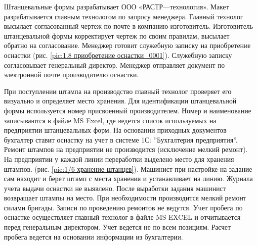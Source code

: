 Штанцевальные формы разрабатывает ООО «РАСТР—технология».
Макет разрабатывается главным технологом по запросу менеджера. 
Главный технолог высылает согласованный чертеж по почте в компанию-изготовитель.
Изготовитель штанцевальной формы корректирует чертеж по своим правилам, высылает обратно на согласование. Менеджер готовит служебную записку на приобретение оснастки (рис. \ref{pic:1.8 приобретение оснастки_0001}). Служебную записку согласовывает генеральный директор. Менеджер отправляет документ по электронной почте производителю оснастки.%

При поступлении штампа на производство главный технолог  проверяет его визуально и определяет место хранения. Для идентификации штанцевальной формы используется номер присвоенный производителем. Номер и наименование записываются в файле  MS Excel, где ведется список используемых на предприятии штанцевальных форм. На основании приходных документов бухгалтер ставит оснастку на учет в системе 1С: ''Бухгалтерия предприятия''. Ремонт штампов на предприятии не производится (исключение мелкий ремонт). 
На предприятии у каждой линии переработки выделено место для хранения штампов.  (рис. \ref{pic:1/6 хранение штанцев}).
Машинист при настройке на задание сам находит и берет штамп с места хранения и устанавливает на линию. Журнала учета выдачи оснастки не выявлено. После выработки задания машинист  возвращает штампы на место. При необходимости производится мелкий ремонт силами бригады. Записи по проведению ремонтов не ведутся. 
Учет пробега по оснастке осуществляет главный технолог в файле MS EXCEL и отчитывается перед генеральным директором. Учет ведется не по всем позициям. Расчет пробега ведется на основании информации из бухгалтерии.
\clearpage






